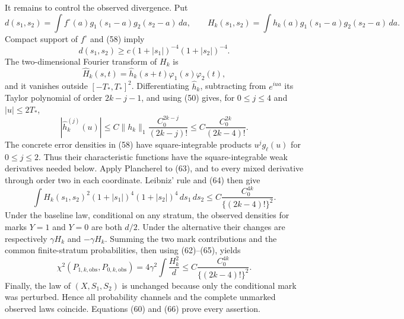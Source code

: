 It remains to control the observed divergence.  Put
\[
d(s_1,s_2)=\int f^\circ(a)g_1(s_1-a)g_2(s_2-a)\,da,
\qquad
H_k(s_1,s_2)=\int h_k(a)g_1(s_1-a)g_2(s_2-a)\,da. \tag{61}
\]
Compact support of \(f^\circ\) and (58) imply
\[
d(s_1,s_2)
\ge c(1+|s_1|)^{-4}(1+|s_2|)^{-4}. \tag{62}
\]
The two-dimensional Fourier transform of \(H_k\) is
\[
\widehat H_k(s,t)=\widehat h_k(s+t)\varphi_1(s)\varphi_2(t), \tag{63}
\]
and it vanishes outside \([-T_*,T_*]^2\).  Differentiating \(\widehat h_k\), subtracting from \(e^{iua}\) its Taylor polynomial of order \(2k-j-1\), and using (50) gives, for \(0\le j\le4\) and \(|u|\le2T_*\),
\[
|\widehat h_k^{(j)}(u)|
\le C\|h_k\|_1\frac{C_0^{2k-j}}{(2k-j)!}
\le C\frac{C_0^{2k}}{(2k-4)!}. \tag{64}
\]
The concrete error densities in (58) have square-integrable products \(u^jg_\ell(u)\) for \(0\le j\le2\).  Thus their characteristic functions have the square-integrable weak derivatives needed below.  Apply Plancherel to (63), and to every mixed derivative through order two in each coordinate.  Leibniz' rule and (64) then give
\[
\int H_k(s_1,s_2)^2(1+|s_1|)^4(1+|s_2|)^4\,ds_1\,ds_2
\le C\frac{C_0^{4k}}{\{(2k-4)!\}^2}. \tag{65}
\]
Under the baseline law, conditional on any stratum, the observed densities for marks \(Y=1\) and \(Y=0\) are both \(d/2\).  Under the alternative their changes are respectively \(\gamma H_k\) and \(-\gamma H_k\).  Summing the two mark contributions and the common finite-stratum probabilities, then using (62)--(65), yields
\[
\chi^2(P_{1,k,\mathrm{obs}},P_{0,k,\mathrm{obs}})
=4\gamma^2\int\frac{H_k^2}{d}
\le C\frac{C_0^{4k}}{\{(2k-4)!\}^2}. \tag{66}
\]
Finally, the law of \((X,S_1,S_2)\) is unchanged because only the conditional mark was perturbed.  Hence all probability channels and the complete unmarked observed laws coincide.  Equations (60) and (66) prove every assertion.
